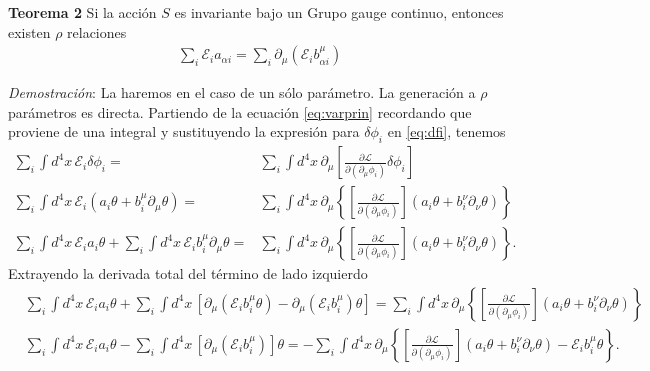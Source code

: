 \begin{frame}
\textbf{Teorema 2} Si la acción $S$ es invariante bajo un Grupo gauge continuo, entonces existen $\rho$ relaciones
\begin{align}
  \sum_{i}\mathcal{E}_{i} a_{\alpha i}=\sum_{i} \partial_{\mu} \left( \mathcal{E}_{i} b^{\mu}_{\alpha i} \right)
\end{align}
\end{frame}
\emph{Demostración}: La haremos en el caso de un sólo parámetro. La generación a $\rho$ parámetros es directa. Partiendo de la ecuación \eqref{eq:varprin} recordando que proviene de una integral y sustituyendo la expresión para $\delta\phi_i$ en \eqref{eq:dfi}, tenemos
\begin{align}
    \sum_i\int {d^4}x\, \mathcal{E}_i \delta\phi_i = & \sum_{i}\int {d^4}x\, \partial_{\mu} \left[  \frac{\partial\mathcal{L}}{\partial(\partial_{\mu}\phi_i)}\delta\phi_i \right]\nonumber\\
      \sum_i \int {d^4}x\, \mathcal{E}_i \left( a_i \theta +b^{\mu}_i \partial_{\mu}\theta \right) =&  \sum_i \int {d^4}x\, \partial_{\mu} \left\{ \left[ \frac{\partial\mathcal{L}}{\partial(\partial_{\mu}\phi_i)}\right] \left( a_i \theta +b^{\nu}_i \partial_{\nu}\theta \right)  \right\}\nonumber\\
      \sum_i \int {d^4}x\, \mathcal{E}_ia_i \theta+\sum_i \int {d^4}x\, \mathcal{E}_i b^{\mu}_i \partial_{\mu}\theta  =&  \sum_i \int {d^4}x\, \partial_{\mu} \left\{ \left[ \frac{\partial\mathcal{L}}{\partial(\partial_{\mu}\phi_i)}\right] \left( a_i \theta +b^{\nu}_i \partial_{\nu}\theta \right)  \right\}.
\end{align}
Extrayendo la derivada total del término de lado izquierdo 
\begin{align}
\label{eq:tn1}
   &   \sum_i \int {d^4}x\, \mathcal{E}_ia_i \theta+\sum_i \int {d^4}x\, \left[ \partial_{\mu} \left(  \mathcal{E}_i b^{\mu}_i \theta \right)-\partial_{\mu} \left(  \mathcal{E}_i b^{\mu}_i  \right) \theta \right]  =  \sum_i \int {d^4}x\, \partial_{\mu} \left\{ \left[ \frac{\partial\mathcal{L}}{\partial(\partial_{\mu}\phi_i)}\right] \left( a_i \theta +b^{\nu}_i \partial_{\nu}\theta \right)  \right\}\nonumber\\
&        \sum_i \int {d^4}x\, \mathcal{E}_ia_i \theta-\sum_i \int {d^4}x\, \left[ \partial_{\mu}   \left(  \mathcal{E}_i b^{\mu}_i  \right) \right] \theta   =-  \sum_i \int {d^4}x\, \partial_{\mu} \left\{ \left[ \frac{\partial\mathcal{L}}{\partial(\partial_{\mu}\phi_i)}\right] \left( a_i \theta +b^{\nu}_i \partial_{\nu}\theta \right) -\mathcal{E}_i b^{\mu}_i \theta  \right\}.
\end{align}
